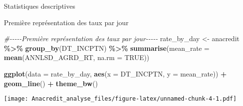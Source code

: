 \documentclass[
]{article}
\newenvironment{Shaded}{\begin{snugshade}}{\end{snugshade}}
\newcommand{\AttributeTok}[1]{\textcolor[rgb]{0.13,0.29,0.53}{#1}}
\newcommand{\CommentTok}[1]{\textcolor[rgb]{0.56,0.35,0.01}{\textit{#1}}}
\newcommand{\ConstantTok}[1]{\textcolor[rgb]{0.56,0.35,0.01}{#1}}
\newcommand{\FunctionTok}[1]{\textcolor[rgb]{0.13,0.29,0.53}{\textbf{#1}}}
\newcommand{\NormalTok}[1]{#1}
\newcommand{\OtherTok}[1]{\textcolor[rgb]{0.56,0.35,0.01}{#1}}
\newcommand{\SpecialCharTok}[1]{\textcolor[rgb]{0.81,0.36,0.00}{\textbf{#1}}}
\begin{document}
Statistiques descriptives

Première représentation des taux par jour

\begin{Shaded}
\begin{Highlighting}[]
\CommentTok{\#{-}{-}{-}{-}{-}Première représentation des taux par jour{-}{-}{-}{-}{-}}
\NormalTok{rate\_by\_day }\OtherTok{\textless{}{-}}\NormalTok{ anacredit }\SpecialCharTok{\%\textgreater{}\%}
  \FunctionTok{group\_by}\NormalTok{(DT\_INCPTN) }\SpecialCharTok{\%\textgreater{}\%}
  \FunctionTok{summarise}\NormalTok{(}\AttributeTok{mean\_rate =} \FunctionTok{mean}\NormalTok{(ANNLSD\_AGRD\_RT, }\AttributeTok{na.rm =} \ConstantTok{TRUE}\NormalTok{))}

\FunctionTok{ggplot}\NormalTok{(}\AttributeTok{data =}\NormalTok{ rate\_by\_day,  }\FunctionTok{aes}\NormalTok{(}\AttributeTok{x =}\NormalTok{ DT\_INCPTN, }\AttributeTok{y =}\NormalTok{ mean\_rate)) }\SpecialCharTok{+}
  \FunctionTok{geom\_line}\NormalTok{() }\SpecialCharTok{+}
  \FunctionTok{theme\_bw}\NormalTok{()}
\end{Highlighting}
\end{Shaded}

\texttt{[image: Anacredit\_analyse\_files/figure-latex/unnamed-chunk-4-1.pdf]}
\end{document}
